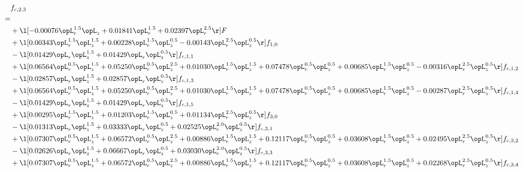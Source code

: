 \begin{alignat}{2} 
\label{eq:f_23_1} 
& f_{c,2,3} \nonumber \\ 
 = \\ 
& + \l[  -0.00076 \opL_r^{1.5} \opL_z +  0.01841 \opL_r^{1.5} +  0.02397 \opL_r^{2.5}  \r] F \nonumber \\ 
& + \l[  0.00343 \opL_r^{1.5} \opL_z^{1.5} +  0.00228 \opL_r^{1.5} \opL_z^{0.5}   -0.00143 \opL_r^{2.5} \opL_z^{0.5}  \r] f_{1,0} \nonumber \\ 
& - \l[  0.01429 \opL_r \opL_z^{1.5} +  0.01429 \opL_r \opL_z^{0.5}  \r] f_{c,1,1} \nonumber \\ 
& + \l[  0.06564 \opL_r^{0.5} \opL_z^{1.5} +  0.05250 \opL_r^{0.5} \opL_z^{2.5} +  0.01030 \opL_r^{1.5} \opL_z^{1.5} +  0.07478 \opL_r^{0.5} \opL_z^{0.5} +  0.00685 \opL_r^{1.5} \opL_z^{0.5}   -0.00316 \opL_r^{2.5} \opL_z^{0.5}  \r] f_{c,1,2} \nonumber \\ 
& - \l[  0.02857 \opL_r \opL_z^{1.5} +  0.02857 \opL_r \opL_z^{0.5}  \r] f_{c,1,3} \nonumber \\ 
& + \l[  0.06564 \opL_r^{0.5} \opL_z^{1.5} +  0.05250 \opL_r^{0.5} \opL_z^{2.5} +  0.01030 \opL_r^{1.5} \opL_z^{1.5} +  0.07478 \opL_r^{0.5} \opL_z^{0.5} +  0.00685 \opL_r^{1.5} \opL_z^{0.5}   -0.00287 \opL_r^{2.5} \opL_z^{0.5}  \r] f_{c,1,4} \nonumber \\ 
& - \l[  0.01429 \opL_r \opL_z^{1.5} +  0.01429 \opL_r \opL_z^{0.5}  \r] f_{c,1,5} \nonumber \\ 
& + \l[  0.00295 \opL_r^{1.5} \opL_z^{1.5} +  0.01203 \opL_r^{1.5} \opL_z^{0.5} +  0.01134 \opL_r^{2.5} \opL_z^{0.5}  \r] f_{3,0} \nonumber \\ 
& - \l[  0.01313 \opL_r \opL_z^{1.5} +  0.03333 \opL_r \opL_z^{0.5} +  0.02525 \opL_r^{2.0} \opL_z^{0.5}  \r] f_{c,3,1} \nonumber \\ 
& + \l[  0.07307 \opL_r^{0.5} \opL_z^{1.5} +  0.06572 \opL_r^{0.5} \opL_z^{2.5} +  0.00886 \opL_r^{1.5} \opL_z^{1.5} +  0.12117 \opL_r^{0.5} \opL_z^{0.5} +  0.03608 \opL_r^{1.5} \opL_z^{0.5} +  0.02495 \opL_r^{2.5} \opL_z^{0.5}  \r] f_{c,3,2} \nonumber \\ 
& - \l[  0.02626 \opL_r \opL_z^{1.5} +  0.06667 \opL_r \opL_z^{0.5} +  0.03030 \opL_r^{2.0} \opL_z^{0.5}  \r] f_{c,3,3} \nonumber \\ 
& + \l[  0.07307 \opL_r^{0.5} \opL_z^{1.5} +  0.06572 \opL_r^{0.5} \opL_z^{2.5} +  0.00886 \opL_r^{1.5} \opL_z^{1.5} +  0.12117 \opL_r^{0.5} \opL_z^{0.5} +  0.03608 \opL_r^{1.5} \opL_z^{0.5} +  0.02268 \opL_r^{2.5} \opL_z^{0.5}  \r] f_{c,3,4} \nonumber \\ 

\end{alignat}
